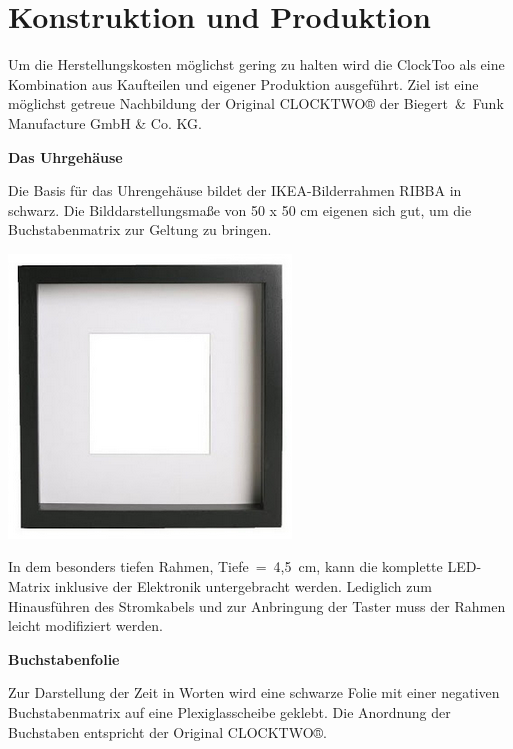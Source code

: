 
\section{Konstruktion und Produktion}
\label{sec:KonstruktionFertigung}

\begin{multicols}{2}
Um die Herstellungskosten möglichst gering zu halten wird die ClockToo als eine Kombination aus Kaufteilen und eigener Produktion ausgeführt. Ziel ist eine möglichst getreue Nachbildung der Original CLOCKTWO® der Biegert~\&~Funk Manufacture GmbH \& Co. KG. 

\textbf{Das Uhrgehäuse}

Die Basis für das Uhrengehäuse bildet der IKEA-Bilderrahmen RIBBA in schwarz. Die Bilddarstellungsmaße von 50 x 50 cm eigenen sich gut, um die Buchstabenmatrix zur Geltung zu bringen. 

{
\centering \includegraphics[width=0.75\columnwidth]{Abbildungen/Konstruktion/Ribba02} %

}
In dem besonders tiefen Rahmen,  Tiefe~=~4,5~cm, kann die komplette LED-Matrix inklusive der Elektronik untergebracht werden. Lediglich zum Hinausführen des Stromkabels und zur Anbringung der Taster muss der Rahmen leicht modifiziert werden.


\textbf{Buchstabenfolie}

Zur Darstellung der Zeit in Worten wird eine schwarze Folie mit einer negativen Buchstabenmatrix auf eine Plexiglasscheibe geklebt. Die Anordnung der Buchstaben entspricht der Original CLOCKTWO®. 


\end{multicols}
